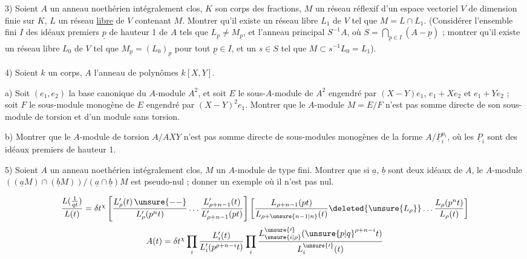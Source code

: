 3) Soient $A$ un anneau noethérien intégralement clos, $K$ son corps des fractions, $M$ un réseau réflexif d'un espace vectoriel $V$ de dimension finie sur $K$, $L$ un réseau \uline{libre} de $V$ contenant $M$. Montrer qu'il existe un réseau libre $L_1$ de $V$ tel que $M=L\cap L_1$. (Considérer l'ensemble fini $I$ des idéaux premiers $\underline p$ de hauteur 1 de $A$ tels que $L_{\underline p}\ne M_{\underline p}$, et l'anneau principal $S^{-1}A$, où $S=\bigcap_{\underline p\in I}(A-\underline p)$ ; montrer qu'il existe un réseau libre $L_0$ de $V$ tel que $M_{\underline p}=(L_0)_{\underline p}$ pour tout $\underline p\in I$, et un $s\in S$ tel que $M\subset s^{-1}L_0=L_1$).

4) Soient $k$ un corps, $A$ l'anneau de polynômes $k[X,Y]$.

a) Soit $(e_1,e_2)$ la base canonique du $A$-module $A^2$, et soit $E$ le sous-$A$-module de $A^2$ engendré par $(X-Y)e_1$, $e_1+Xe_2$ et $e_1+Ye_2$ ; soit $F$ le sous-module monogène de $E$ engendré par $(X-Y)^2e_1$. Montrer que le $A$-module $M=E/F$ n'est pas somme directe de son sous-module de torsion et d'un module sans torsion.

b) Montrer que le $A$-module de torsion $A/AXY$ n'est pas somme directe de sous-modules monogènes de la forme $A/\underline P_i^{n_i}$, où les $\underline P_i$ sont des idéaux premiers de hauteur 1.

5) Soient $A$ un anneau noethérien intégralement clos, $M$ un $A$-module de type fini. Montrer que si $\underline a$, $\underline b$ sont deux idéaux de $A$, le $A$-module $((\underline aM)\cap(\underline bM))/(\underline a\cap\underline b)M$ est pseudo-nul ; donner un exemple où il n'est pas nul.

\[
\frac{L(\frac1{qt})}{L(t)}=\delta t^\chi
\left[\frac{L'_\rho(t)\,\unsure{--}}{L'_\rho(p^nt)}\ldots\frac{L'_{\rho+n-1}(t)}{L'_{\rho+n-1}(pt)}\right]
\left[\frac{L_{\rho+n-1}(pt)}{L_{\rho+\unsure{n-1|n}}(t)}\deleted{\unsure{L_\rho}}\ldots\frac{L_\rho(p^nt)}{L_\rho(t)}\right]
\]
\[
A(t)=\delta t^\chi\prod_i\frac{L'_i(t)}{L'_i(p^{\rho+n-i}t)}\prod_i\frac{L^{\unsure{\prime}}_{\unsure{i|\rho}}(\unsure{p|q}^{\rho+n-i}t)}{L^{\unsure{\prime}}_i(t)}
\]


